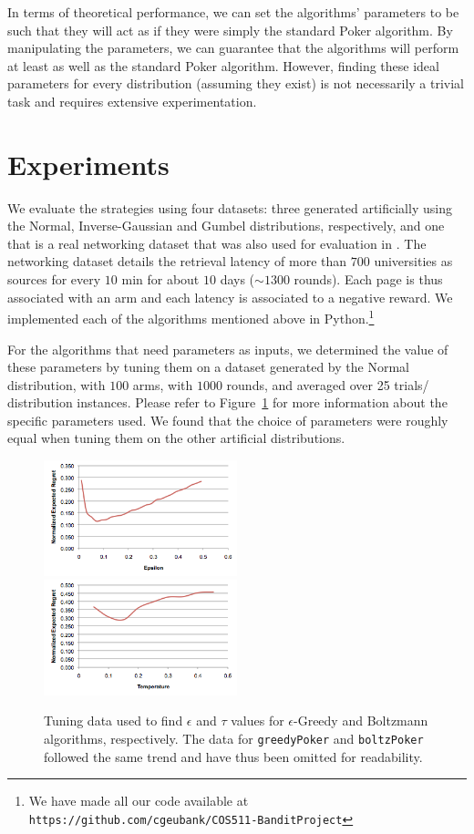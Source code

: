 \documentclass[12pt]{article}
\begin{document}
In terms of theoretical performance, we can set the algorithms' parameters to be such that they will act as if they were simply the standard Poker algorithm. By manipulating the parameters, we can guarantee that the algorithms will perform at least as well as the standard Poker algorithm. However, finding these ideal parameters for every distribution (assuming they exist) is not necessarily a trivial task and requires extensive experimentation.

\section{Experiments}

We evaluate the strategies using four datasets: three generated artificially using the Normal, Inverse-Gaussian and Gumbel distributions, respectively,
and one that is a real networking dataset that was also used for evaluation in \cite{Mohri}.  The networking dataset details the retrieval latency of more than $700$
universities as sources for every $10$ min for about $10$ days ($\sim 1300$ rounds).  Each page is thus associated with an arm and each latency is associated to a negative reward.
We implemented each of the algorithms mentioned above in Python.\footnote{We have made all our code available at \texttt{https://github.com/cgeubank/COS511-BanditProject}}

For the algorithms that need parameters as inputs, we determined the value of these parameters by tuning them on a dataset generated by the Normal distribution, with $100$ arms,
with $1000$ rounds, and averaged over 25 trials/ distribution instances.  Please refer to Figure~\ref{fig:tuning} for more information about the specific parameters used.  We found that the choice of parameters
were roughly equal when tuning them on the other artificial distributions.

\begin{figure}
\includegraphics[width=0.5\textwidth]{EpsilonTuning}
\hfill
\includegraphics[width=0.5\textwidth]{TempTuning}
\caption{Tuning data used to find $\epsilon$ and $\tau$ values for $\epsilon$-Greedy and Boltzmann algorithms, respectively.  The data for \texttt{greedyPoker} and \texttt{boltzPoker} followed the same trend and have thus been omitted for readability.}
\label{fig:tuning}
\end{figure}
\end{document}

